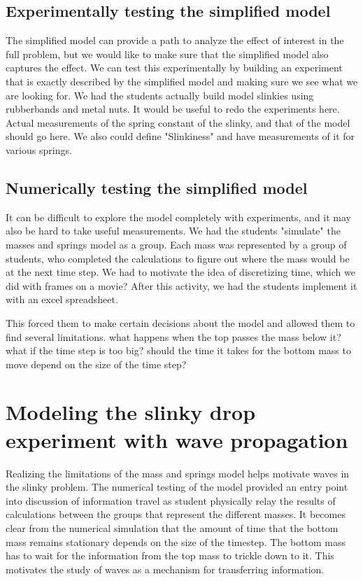 \documentclass[aps,pre,10pt,superscriptaddress,showpacs,amsmath,amssymb,nofootinbib]{revtex4-1}
\begin{document}
\subsection{Experimentally testing the simplified model}
The simplified model can provide a path to analyze the effect of interest in the
full problem, but we would like to make sure that the simplified model also
captures the effect.  We can test this experimentally by building an experiment
that is exactly described by the simplified model and making sure we see what we
are looking for.  We had the students actually build model slinkies using
rubberbands and metal nuts.  It would be useful to redo the experiments here.
Actual measurements of the spring constant of the slinky, and that of the model 
should go here.  We also could define "Slinkiness" and have measurements of it
for various springs.


\subsection{Numerically testing the simplified model}
It can be difficult to explore the model completely with experiments,  and it
may also be hard to take useful measurements.  We had the students "simulate"
the masses and springs model as a group. Each mass was represented by a group of
students, who completed the calculations to figure out where the mass would be
at the next time step.  We had to motivate the idea of discretizing time, which
we did with frames on a movie?  After this activity, we had the students
implement it with an excel spreadsheet.

This forced them to make certain decisions about the model and allowed them to
find several limitations.  what happens when the top passes the mass below it? 
what if the time step is too big?  should the time it takes for the bottom mass
to move depend on the size of the time step?


\section{Modeling the slinky drop experiment with wave propagation}

Realizing the limitations of the  mass and springs model helps motivate waves in
the slinky problem.  The numerical testing of the model provided an entry point
into discussion of information travel as student  physically relay the results
of calculations between the groups that represent the different masses.  It
becomes clear from the numerical simulation that the amount of time that the
bottom mass remains stationary depends on the size of the timestep.  The bottom
mass has to wait for the information from the top mass to trickle down to it. 
This motivates the study of waves as a mechanism for transferring information.
\end{document}
